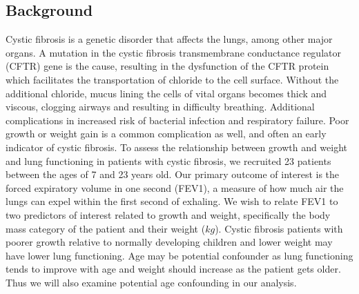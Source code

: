 \documentclass{article}
\begin{document}
\begin{enumerate}
		\subsection*{Background}
		
		Cystic fibrosis is a genetic disorder that affects the lungs, among other major organs. A mutation in the cystic fibrosis transmembrane conductance regulator (CFTR) gene is the cause, resulting in the dysfunction of the CFTR protein which facilitates the transportation of chloride to the cell surface. Without the additional chloride, mucus lining the cells of vital organs becomes thick and viscous, clogging airways and resulting in difficulty breathing. Additional complications in increased risk of bacterial infection and respiratory failure. Poor growth or weight gain is a common complication as well, and often an early indicator of cystic fibrosis. To assess the relationship between growth and weight and lung functioning in patients with cystic fibrosis, we recruited 23 patients between the ages of 7 and 23 years old. Our primary outcome of interest is the forced expiratory volume in one second (FEV1), a measure of how much air the lungs can expel within the first second of exhaling. We wish to relate FEV1 to two predictors of interest related to growth and weight, specifically the body mass category of the patient and their weight ($kg$). Cystic fibrosis patients with poorer growth relative to normally developing children and lower weight may have lower lung functioning. Age may be potential confounder as lung functioning tends to improve with age and weight should increase as the patient gets older. Thus we will also examine potential age confounding in our analysis.
		
	\end{enumerate}
		
\end{document}
